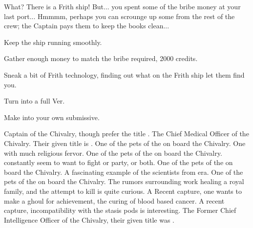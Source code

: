 \documentclass[char]{guildcamp4}
\begin{document}
What? There is a Frith ship! But... you spent some of the bribe money at your last port... Hmmmm, perhaps you can scrounge up some from the rest of the crew; the Captain pays them to keep the books clean...

\begin{itemz}[Goals]
	\item Keep the ship running smoothly.
	\item Gather enough money to match the bribe required, 2000 credits.
	\item Sneak a bit of Frith technology, finding out what on the Frith ship let them find you.
	\item Turn \cJulie{} into a full Ver.
	\item Make \cJulie{} into your own submissive.
\end{itemz}

\begin{contacts}
	\contact{\cVone{}} Captain of the Chivalry, though \cVone{\they} prefer the title \cVone{\Duke}.
	\contact{\cVthree{}}The Chief Medical Officer of the Chivalry. Their given title is \cVtwo{\Baron}.
	\contact{\cJoan{}} One of the pets of the \cVone{\Duke} on board the Chivalry. One with much religious fervor.
	\contact{\cJulie{}} One of the pets of the \cVone{\Duke} on board the Chivalry. \cJulie{\they} constantly seem to want to fight or party, or both.
	\contact{\cJames{}} One of the pets of the \cVone{\Duke} on board the Chivalry. A fascinating example of the scientists from \cJames{\their} era.
	\contact{\cRasputin{}} One of the pets of the \cVone{\Duke} on board the Chivalry. The rumors surrounding \cRasputin{\their} work healing a royal family, and the attempt to kill \cRasputin{\them} is quite curious.
	\contact{\cSpite{}} A Recent capture, one \cVone{} wants to make a ghoul for \cSpite{\their} achievement, the curing of blood based cancer.
	\contact{\cPlead{}} A recent capture, \cPlead{\their} incompatibility with the stasis pods is interesting.
	\contact{\cIntel{}} The Former Chief Intelligence Officer of the Chivalry, their given title was \cIntel{\Count}.
\end{contacts}
\end{document}
